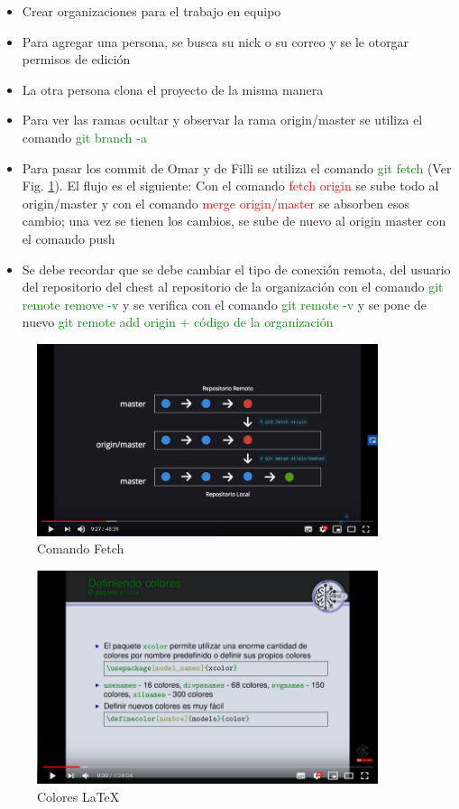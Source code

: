 \documentclass{article}
\begin{document}
		\begin{itemize}
		\item Crear organizaciones para el trabajo en equipo
		\item Para agregar una persona, se busca su nick o su correo y se le otorgar permisos de edición
		\item La otra persona clona el proyecto de la misma manera
		\item Para ver las ramas ocultar y observar la rama origin/master se utiliza el comando \textcolor{green}{git branch -a}
		\item Para pasar los commit de Omar y de Filli se utiliza el comando \textcolor{green}{git fetch} (Ver Fig. \ref{fetch}). El flujo es el siguiente: Con el comando \textcolor{red}{fetch origin} se sube todo al origin/master y con el comando  \textcolor{red}{merge origin/master} se absorben esos cambio; una vez se tienen los cambios, se sube de nuevo al origin master con el comando push
		\item Se debe recordar que se debe cambiar el tipo de conexión remota, del usuario del repositorio del chest al repositorio de la organización con el comando \textcolor{green}{git remote remove -v} y se verifica con el comando \textcolor{green}{git remote -v} y se pone de nuevo \textcolor{green}{git remote add origin $+$ código de la organización}
		
	\end{itemize}

	\begin{figure}[t!]
		\centering
		\includegraphics[width = 100mm]{imagenes/fetch2}
		\caption{Comando Fetch}
		\label{fetch}
	\end{figure}

		\begin{figure}[th]
		\centering
		\includegraphics[width = 100mm]{imagenes/Colores}
		\caption{Colores \LaTeX{}}
		\label{colores}
	\end{figure}
\end{document}
